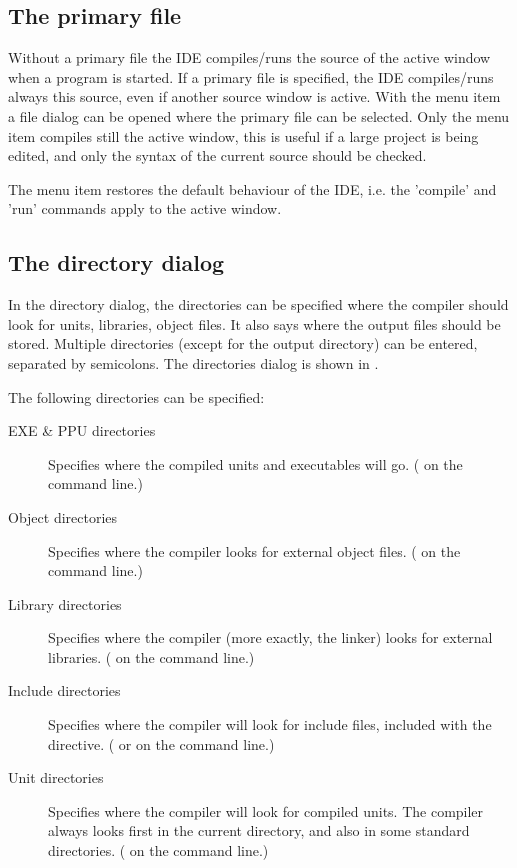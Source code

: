 \subsection{The primary file}
\label{se:primaryfile}
Without a primary file the IDE compiles/runs the source of the active
window when a program is started. If a primary file is specified,
the IDE compiles/runs always this source, even if another
source window is active. With the menu item 
a file dialog can be opened where the primary file can be selected.
Only the menu item  compiles still the active window,
this is useful if a large project is being edited, and only the syntax of
the current source should be checked.

The menu item  restores the default
behaviour of the IDE, i.e. the 'compile' and 'run' commands apply to the
active window.
%
%
\subsection{The directory dialog}
In the directory dialog, the directories can be specified where the
compiler should look for units, libraries, object files. It also says
where the output files should be stored. Multiple directories (except
for the output directory) can be entered, separated by semicolons.
The directories dialog is shown in .


The following directories can be specified:
\begin{description}
\item[EXE \& PPU directories] Specifies where the compiled units and
executables will go. ( on the command line.)
\item[Object directories] Specifies where the compiler looks for external
object files. ( on the command line.)
\item[Library directories] Specifies where the compiler (more exactly, the
linker) looks for external libraries. ( on the command line.)
\item[Include directories] Specifies where the compiler will look for
include files, included with the  directive.
( or  on the command line.)
\item[Unit directories] Specifies where the compiler will look for compiled
units. The compiler always looks first in the current directory, and also in
some standard directories. ( on the command line.)
\end{description}
%
%
